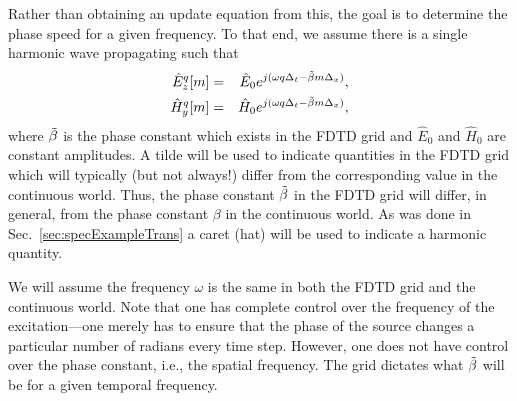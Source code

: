 Rather than obtaining an update equation from this, the goal is to
determine the phase speed for a given frequency.  To that end, we
assume there is a single harmonic wave propagating such that
\begin{eqnarray}
  \fdtd{\hat{E}_z}{m}{q} &=& \hat{E}_0 e^{j(\omega q \Delt - \tbeta m \Delx)}, 
  \label{eq:ezEigen} \\
  \fdtd{\hat{H}_y}{m}{q} &=& \hat{H}_0 e^{j(\omega q \Delt - \tbeta m \Delx)},
  \label{eq:hyEigen}
\end{eqnarray}
where $\tilde{\beta}$ is the phase constant which exists in the FDTD grid and
$\hat{E}_0$ and $\hat{H}_0$ are constant amplitudes.  A tilde will be
used to indicate quantities in the FDTD grid which will typically (but
not always!)  differ from the corresponding value in the continuous
world.  Thus, the phase constant $\tilde{\beta}$ in the FDTD grid will
differ, in general, from the phase constant $\beta$ in the continuous
world.  As was done in Sec.\ \ref{sec:specExampleTrans} a caret (hat) will
be used to indicate a harmonic quantity.

We will assume the frequency $\omega$ is the same in both the FDTD
grid and the continuous world.  Note that one has complete control
over the frequency of the excitation---one merely has to ensure that
the phase of the source changes a particular number of radians every
time step.  However, one does not have control over the phase
constant, i.e., the spatial frequency.  The grid dictates what
$\tilde{\beta}$ will be for a given temporal frequency.

